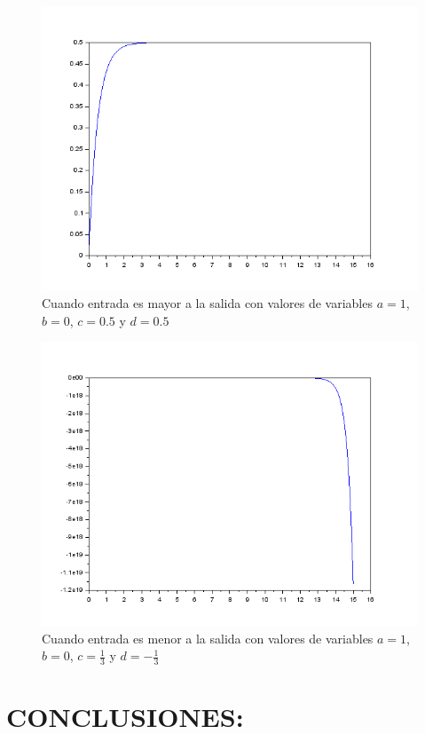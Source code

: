 \documentclass[letterpaper,10pt]{article}
\begin{document}
\begin{figure}[h!]
	\centering
	\includegraphics[width=0.5\linewidth]{mis}
	\caption{Cuando entrada es mayor a la salida con valores de variables $a=1$, $b=0$, $c=0.5$ y $d=0.5$}
	\label{fig:mis}
\end{figure}

\begin{figure}[h!]
	\centering
	\includegraphics[width=0.5\linewidth]{msi}
	\caption{Cuando entrada es menor a la salida con valores de variables $a=1$, $b=0$, $c=\frac{1}{3}$ y $d=-\frac{1}{3}$}
	\label{fig:msi}
\end{figure}
\FloatBarrier

	\section{CONCLUSIONES:}
\end{document}
